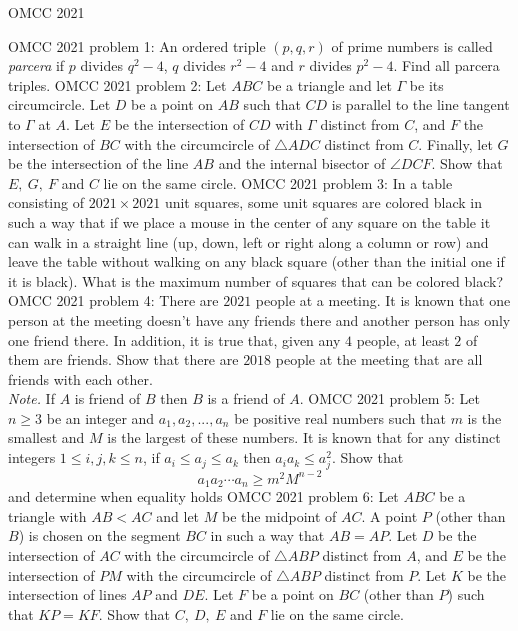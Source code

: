 
OMCC 2021 

OMCC 2021 problem 1:  An ordered triple $(p, q, r)$ of prime numbers is called \textit{parcera} if $p$ divides $q^2-4$, $q$ divides $r^2-4$ and $r$ divides $p^2-4$. Find all parcera triples. 
OMCC 2021 problem 2:  Let $ABC$ be a triangle and let $\Gamma$ be its circumcircle. Let $D$ be a point on $AB$ such that $CD$ is parallel to the line tangent to $\Gamma$ at $A$. Let $E$ be the intersection of $CD$ with $\Gamma$ distinct from $C$, and $F$ the intersection of $BC$ with the circumcircle of $\bigtriangleup ADC$ distinct from $C$. Finally, let $G$ be the intersection of the line $AB$ and the internal bisector of $\angle DCF$. Show that $E,\ G,\ F$ and $C$ lie on the same circle. 
OMCC 2021 problem 3:  In a table consisting of $2021\times 2021$ unit squares, some unit squares are colored black in such a way that if we place a mouse in the center of any square on the table it can walk in a straight line (up, down, left or right along a column or row) and leave the table without walking on any black square (other than the initial one if it is black). What is the maximum number of squares that can be colored black? 
OMCC 2021 problem 4:  There are $2021$ people at a meeting. It is known that one person at the meeting doesn't have any friends there and another person has only one friend there. In addition, it is true that, given any $4$ people, at least $2$ of them are friends. Show that there are $2018$ people at the meeting that are all friends with each other. \\
\textit{Note. }If $A$ is friend of $B$ then $B$ is a friend of $A$. 
OMCC 2021 problem 5:  Let $n \geq 3$ be an integer and $a_1,a_2,...,a_n$ be positive real numbers such that $m$ is the smallest and $M$ is the largest of these numbers. It is known that for any distinct integers $1 \leq i,j,k \leq n$, if $a_i \leq a_j \leq a_k$ then $a_ia_k \leq a_j^2$. Show that
\[ a_1a_2 \cdots a_n \geq m^2M^{n-2} \]
and determine when equality holds 
OMCC 2021 problem 6:  Let $ABC$ be a triangle with $AB<AC$ and let $M$ be the midpoint of $AC$. A point $P$ (other than $B$) is chosen on the segment $BC$ in such a way that $AB=AP$. Let $D$ be the intersection of $AC$ with the circumcircle of $\bigtriangleup ABP$ distinct from $A$, and $E$ be the intersection of $PM$ with the circumcircle of $\bigtriangleup ABP$ distinct from $P$. Let $K$ be the intersection of lines $AP$ and $DE$. Let $F$ be a point on $BC$ (other than $P$) such that $KP=KF$. Show that $C,\ D,\ E$ and $F$ lie on the same circle. 

